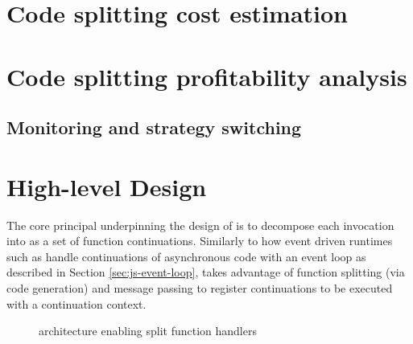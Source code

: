 \section{Code splitting cost estimation}

\section{Code splitting profitability analysis}
\label{sec:faas-code-splitting-profitability}

\subsection{Monitoring and strategy switching}

\section{High-level Design}
The core principal underpinning the design of \faaas{} is to decompose each \faas{} invocation into as a set of function continuations. Similarly to how event driven runtimes such as \js{} handle continuations of asynchronous code with an event loop as described in Section \ref{sec:js-event-loop}, \faaas{} takes advantage of function splitting (via code generation) and message passing to register continuations to be executed with a continuation context.

\begin{figure}[htp]
    \centering
    \quad
    \caption{\faas{} architecture enabling split function handlers}
\end{figure}

